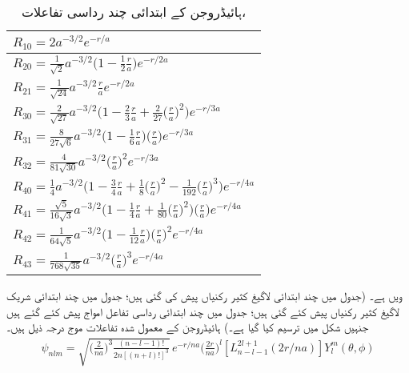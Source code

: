\begin{table}
\caption{ہائیڈروجن کے ابتدائی چند رداسی تفاعلات، }
\label{جدول_ابعادی_ہائیڈروجن_رداسی_تفاعل}
\centering
\renewcommand{\arraystretch}{2}
\begin{tabular}{l}
\toprule
$R_{10}=2a^{-3/2}e^{-r/a}$\\
\midrule
$R_{20}=\frac{1}{\sqrt{2}}a^{-3/2}\big(1-\frac{1}{2}\frac{r}{a}\big)e^{-r/2a}$\\
$R_{21}=\frac{1}{\sqrt{24}}a^{-3/2}\frac{r}{a}e^{-r/2a}$\\
\midrule
$R_{30}=\frac{2}{\sqrt{27}}a^{-3/2}\big(1-\frac{2}{3}\frac{r}{a}+\frac{2}{27}\big(\frac{r}{a}\big)^2\big)e^{-r/3a}$\\
$R_{31}=\frac{8}{27\sqrt{6}}a^{-3/2}\big(1-\frac{1}{6}\frac{r}{a}\big)\big(\frac{r}{a}\big)e^{-r/3a}$\\
$R_{32}=\frac{4}{81\sqrt{30}}a^{-3/2}\big(\frac{r}{a}\big)^2e^{-r/3a}$\\
\midrule
$R_{40}=\frac{1}{4}a^{-3/2}\big(1-\frac{3}{4}\frac{r}{a}+\frac{1}{8}\big(\frac{r}{a}\big)^2-\frac{1}{192}\big(\frac{r}{a}\big)^3\big)e^{-r/4a}$\\
$R_{41}=\frac{\sqrt{5}}{16\sqrt{3}}a^{-3/2}\big(1-\frac{1}{4}\frac{r}{a}+\frac{1}{80}\big(\frac{r}{a}\big)^2\big)\big(\frac{r}{a}\big)e^{-r/4a}$\\
$R_{42}=\frac{1}{64\sqrt{5}}a^{-3/2}\big(1-\frac{1}{12}\frac{r}{a}\big)\big(\frac{r}{a}\big)^2e^{-r/4a}$\\
$R_{43}=\frac{1}{768\sqrt{35}}a^{-3/2}\big(\frac{r}{a}\big)^3e^{-r/4a}$\\
\bottomrule
\end{tabular}
\end{table}
  ویں  ہے۔ (جدول  میں چند ابتدائی لاگیغ  کثیر رکنیاں  پیش کی گئی ہیں؛ جدول  میں چند ابتدائی شریک لاگیغ  کثیر رکنیاں پیش کئے گئی ہیں؛  جدول  میں چند ابتدائی رداسی تفاعل امواج پیش کئے گئے ہیں جنہیں شکل  میں ترسیم کیا گیا ہے۔) ہائیڈروجن کے معمول شدہ تفاعلات موج درجہ ذیل ہیں۔
  \begin{align}
\psi_{nlm}=\sqrt{\big(\frac{2}{na}\big)^3\frac{(n-l-1)!}{2n[(n+l)!]^{3}}}\,e^{-r/na}\big(\frac{2r}{na}\big)^{l}[L_{n-l-1}^{2l+1}(2r/na)]Y_{l}^{m}(\theta,\phi)
\end{align}
